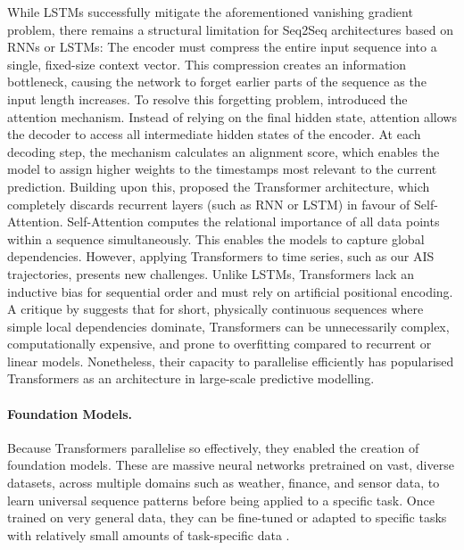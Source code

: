While \acp{LSTM} successfully mitigate the aforementioned vanishing gradient problem, there remains a structural limitation for \ac{Seq2Seq} architectures based on \acp{RNN} or \acp{LSTM}:
The encoder must compress the entire input sequence into a single, fixed-size context vector. %
This compression creates an information bottleneck, causing the network to forget earlier parts of the sequence as the input length increases.  
To resolve this forgetting problem, \textcite{bahdanau2016neuralmachinetranslationjointly} introduced the attention mechanism.
Instead of relying on the final hidden state, attention allows the decoder to access all intermediate hidden states of the encoder.
At each decoding step, the mechanism calculates an alignment score, which enables the model to assign higher weights to the timestamps most relevant to the current prediction.
Building upon this, \textcite{attentioniayn} proposed the Transformer architecture, which completely discards recurrent layers (such as \ac{RNN} or \ac{LSTM}) in favour of Self-Attention. 
Self-Attention computes the relational importance of all data points within a sequence simultaneously. This enables the models to capture global dependencies.
However, applying Transformers to %
time series, such as our \ac{AIS} trajectories, presents new challenges. Unlike \acp{LSTM}, Transformers lack an inductive bias for sequential order and must rely on artificial positional encoding. 
A %
critique by \textcite{zeng2022transformerseffectivetimeseries} suggests that for short, physically continuous sequences where simple local dependencies dominate, Transformers can be unnecessarily complex, computationally expensive, and prone to overfitting compared to recurrent or linear models.
Nonetheless, their capacity to parallelise efficiently has popularised Transformers as an architecture in large-scale predictive modelling. %

\paragraph{Foundation Models.}
\label{subsec:foundation}
Because Transformers parallelise so effectively, they enabled the creation of foundation models. These are massive neural networks pretrained on vast, diverse datasets, across multiple domains such as weather, finance, and sensor data, to learn universal sequence patterns before being applied to a specific task. Once trained on very general data, they can be fine-tuned or adapted to specific tasks with relatively small amounts of task-specific data \parencite{Liang_2024foundation}.

